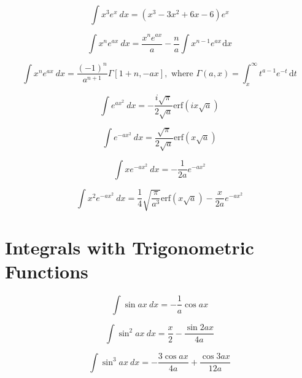\documentclass[12pt,letterpaper,leqno]{article}
\begin{document}
\begin{equation}
\int x^3 e^{x}\ dx = \left(x^3-3x^2 + 6x - 6\right) e^{x} 
\end{equation}
 
\begin{equation}\label{eq:swift1}
\int x^n e^{ax}\ dx = \dfrac{x^n e^{ax}}{a} - 
\dfrac{n}{a}\int x^{n-1}e^{ax}\hspace{1pt}\text{d}x
\end{equation} 
 
\begin{equation}\label{eq:ebke}
\int x^n e^{ax}\ dx = \frac{(-1)^n}{a^{n+1}}\Gamma[1+n,-ax], 
 \text{ where } \Gamma(a,x)=\int_x^{\infty} t^{a-1}e^{-t}\hspace{2pt}\text{d}t
 \end{equation}

\begin{equation}\label{eq:swift2}
\int e^{ax^2}\ dx = -\frac{i\sqrt{\pi}}{2\sqrt{a}}\text{erf}\left(ix\sqrt{a}\right) 
\end{equation}

\begin{equation}\label{eq:swift3}
\int e^{-ax^2}\ dx = \frac{\sqrt{\pi}}{2\sqrt{a}}\text{erf}\left(x\sqrt{a}\right) 
\end{equation}

\begin{equation}\label{eq:qarles1}
\int x e^{-ax^2}\ {dx} = -\dfrac{1}{2a}e^{-ax^2} 
\end{equation}

\begin{equation}\label{eq:qarles2}
\int x^2 e^{-ax^2}\ {dx} = \dfrac{1}{4}\sqrt{\dfrac{\pi}{a^3}}\text{erf}(x\sqrt{a}) -\dfrac{x}{2a}e^{-ax^2}
\end{equation}


\section* {Integrals with Trigonometric Functions}

\begin{equation}
\int \sin ax \ dx = -\frac{1}{a} \cos ax 
\end{equation}

\begin{equation}
\int \sin^2 ax\  dx = \frac{x}{2} - \frac{\sin 2ax} {4a} 
\end{equation}

\begin{equation}
\int \sin^3 ax \ dx = -\frac{3 \cos ax}{4a} + \frac{\cos 3ax} {12a} 
\end{equation}
\end{document}
